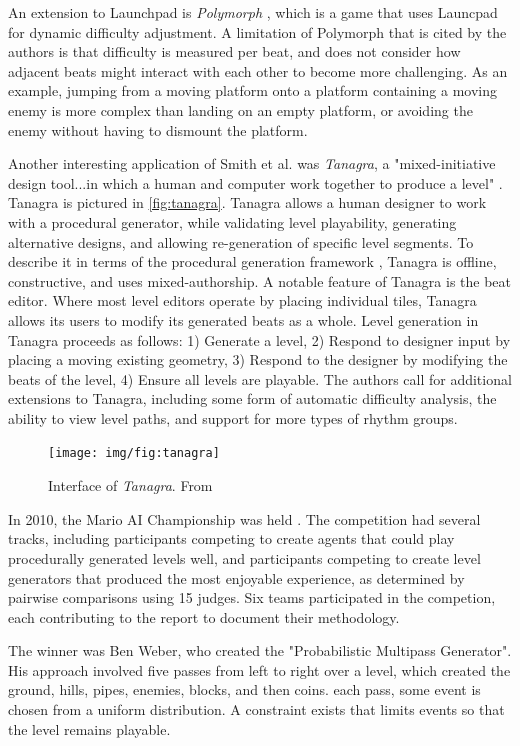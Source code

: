 An extension to Launchpad is \emph{Polymorph} \cite{jennings-teats2010}, which is a game
that uses Launcpad for dynamic difficulty adjustment. A limitation of Polymorph that is
cited by the authors is that difficulty is measured per beat, and does not consider how
adjacent beats might interact with each other to become more challenging. As an example,
jumping from a moving platform onto a platform containing a moving enemy is more complex
than landing on an empty platform, or avoiding the enemy without having to dismount the
platform.

Another interesting application of Smith et al. was \emph{Tanagra}, a "mixed-initiative
design tool...in which a human and computer work together to produce a level" 
\cite{smith2010}. Tanagra is pictured in \autoref{fig:tanagra}. Tanagra allows a human
designer to work with a procedural generator, while validating level playability, generating
alternative designs, and allowing re-generation of specific level segments. To describe it
in terms of the procedural generation framework \cite{togelius2011}, Tanagra is offline,
constructive, and uses mixed-authorship. A notable feature of Tanagra is the beat editor.
Where most level editors operate by placing individual tiles, Tanagra allows its users to
modify its generated beats as a whole. Level generation in Tanagra proceeds as follows:
1) Generate a level, 2) Respond to designer input by placing a moving existing geometry, 3)
Respond to the designer by modifying the beats of the level, 4) Ensure all levels are
playable. The authors call for additional extensions to Tanagra, including some form of
automatic difficulty analysis, the ability to view level paths, and support for more types
of rhythm groups.

\begin{figure}[h]
    \texttt{[image: img/fig:tanagra]}
    \caption{Interface of \emph{Tanagra}. From \cite{smith2010}}
    \label{fig:tanagra}
\end{figure}

In 2010, the Mario AI Championship was held \cite{shaker2011}. The competition had several
tracks, including participants competing to create agents that could play procedurally
generated levels well, and participants competing to create level generators that produced
the most enjoyable experience, as determined by pairwise comparisons using 15 judges.
Six teams participated in the competion, each contributing to the report to document their
methodology.

The winner was Ben Weber, who created the "Probabilistic Multipass Generator". His approach
involved five passes from left to right over a level, which created the ground, hills, 
pipes, enemies, blocks, and then coins. each pass, some event is chosen from a uniform
distribution. A constraint exists that limits events so that the level remains playable.

